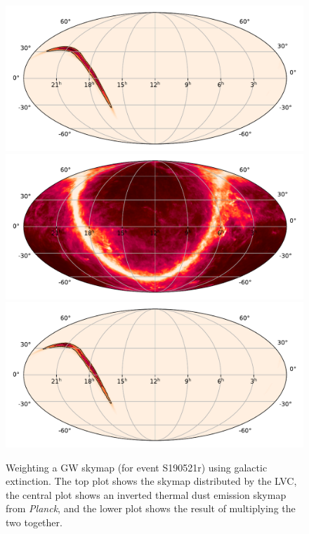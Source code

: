 \begin{colsection}
\begin{figure}[p]
    \begin{center}
        \includegraphics[width=0.8\linewidth]{images/tiling/ext_before.pdf}
        \includegraphics[width=0.8\linewidth]{images/tiling/ext.pdf}
        \includegraphics[width=0.8\linewidth]{images/tiling/ext_after.pdf}
    \end{center}
    \caption[Weighting a GW skymap using galactic extinction]{
        Weighting a GW skymap (for event S190521r) using galactic extinction. The top plot shows the skymap distributed by the LVC, the central plot shows an inverted thermal dust emission skymap from \textit{Planck}, and the lower plot shows the result of multiplying the two together.
    }\label{fig:extinction_skymap}
\end{figure}

\end{colsection}


